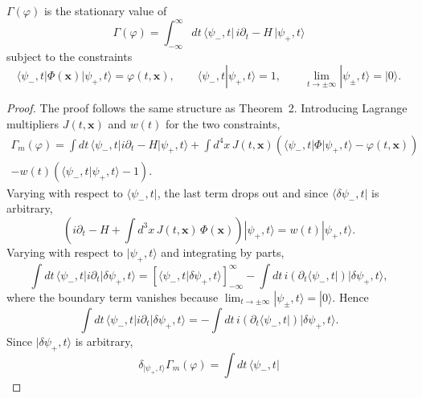 \begin{theorem}
	$\Gamma(\varphi)$ is the stationary value of
	\begin{equation}
		\Gamma(\varphi) = \int_{-\infty}^{\infty} dt\,
		\langle\psi_-,t|\,i\partial_t - H\,|\psi_+,t\rangle
	\end{equation}
	subject to the constraints
	\begin{equation}
		\langle\psi_-,t|\Phi(\mathbf{x})|\psi_+,t\rangle = \varphi(t,\mathbf{x}),
		\qquad
		\langle\psi_-,t|\psi_+,t\rangle = 1,
		\qquad
		\lim_{t\to\pm\infty}|\psi_\pm,t\rangle = |0\rangle.
	\end{equation}
\end{theorem}

\begin{proof}
	The proof follows the same structure as Theorem~2. Introducing Lagrange
	multipliers $J(t,\mathbf{x})$ and $w(t)$ for the two constraints,
	\begin{multline}
		\Gamma_m(\varphi) = \int dt\,\langle\psi_-,t|i\partial_t -
		H|\psi_+,t\rangle
		+ \int d^4x\,J(t,\mathbf{x})\left(\langle\psi_-,t|\Phi|\psi_+,t\rangle
		- \varphi(t,\mathbf{x})\right) \\
		- w(t)\left(\langle\psi_-,t|\psi_+,t\rangle - 1\right).
	\end{multline}
	Varying with respect to $\langle\psi_-,t|$, the last term drops out and
	since $\langle\delta\psi_-,t|$ is arbitrary,
	\begin{equation}
		\boxed{\left(i\partial_t - H
			+ \int d^3x\,J(t,\mathbf{x})\,\Phi(\mathbf{x})\right)|\psi_+,t\rangle
			= w(t)|\psi_+,t\rangle.}
	\end{equation}
	Varying with respect to $|\psi_+,t\rangle$ and integrating by parts,
	\begin{equation}
		\int dt\,\langle\psi_-,t|i\partial_t|\delta\psi_+,t\rangle
		= \left[\langle\psi_-,t|\delta\psi_+,t\rangle\right]_{-\infty}^{\infty}
		- \int dt\,i\left(\partial_t\langle\psi_-,t|\right)|\delta\psi_+,t\rangle,
	\end{equation}
	where the boundary term vanishes because
	$\lim_{t\to\pm\infty}|\psi_\pm,t\rangle = |0\rangle$. Hence
	\begin{equation}
		\int dt\,\langle\psi_-,t|i\partial_t|\delta\psi_+,t\rangle
		= -\int dt\,i\left(\partial_t\langle\psi_-,t|\right)|\delta\psi_+,t\rangle.
	\end{equation}
	Since $|\delta\psi_+,t\rangle$ is arbitrary,
	\begin{equation}
		\delta_{|\psi_+,t\rangle}\Gamma_m(\varphi) = \int dt\,\langle\psi_-,t|

\end{equation}
\end{proof}
